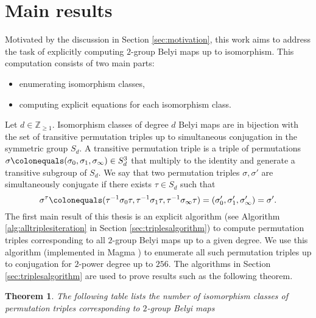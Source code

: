 \documentclass{dcthesis}
\newcommand{\ZZ}{\mathbb Z}
\newcommand{\defi}[1]{\textsf{#1}}
\numberwithin{equation}{section}
\newtheorem{theorem}[equation]{Theorem}
\theoremstyle{definition}
\theoremstyle{remark}
\begin{document}
{{  \section{Main results}{\label{sec:mainresults}
    Motivated by the discussion in
    Section \ref{sec:motivation},
    this work aims to address the task
    of explicitly computing
    $2$-group Belyi maps up to isomorphism.
    This computation consists of two
    main parts:
    \begin{itemize}
      \item
        enumerating isomorphism classes,
      \item
        computing explicit equations
        for each isomorphism class.
    \end{itemize}
    \par
    Let $d\in\ZZ_{\geq 1}$.
    Isomorphism classes of degree $d$
    Belyi maps
    are in bijection with
    the set of
    transitive permutation triples
    up to
    simultaneous conjugation
    in the symmetric group $S_d$.
    A \defi{transitive permutation triple}
    is a triple of permutations
    $\sigma\colonequals
    (\sigma_0,\sigma_1,\sigma_\infty)
    \in S_d^3$
    that multiply to the identity
    and generate a transitive subgroup
    of $S_d$.
    We say
    that two permutation triples
    $\sigma,\sigma'$ are
    \defi{simultaneously conjugate}
    if there exists $\tau\in S_d$ such that
    \begin{equation}\label{eqn:simconj_results}
      \sigma^\tau \colonequals
      (\tau^{-1}\sigma_0\tau, \tau^{-1}\sigma_1\tau, \tau^{-1}\sigma_\infty\tau)
      = \left(\sigma'_0,\sigma'_1,\sigma'_\infty\right)
      = \sigma'.
    \end{equation}
    The first main result of this thesis
    is an explicit algorithm
    (see Algorithm
    \ref{alg:alltriplesiteration}
    in Section \ref{sec:triplesalgorithm})
    to compute permutation triples
    corresponding to all $2$-group Belyi
    maps up to a given degree.
    We use this algorithm (implemented in
    \textsf{Magma} \cite{magma})
    to enumerate
    all such permutation triples
    up to conjugation
    for $2$-power degree
    up to $256$.
    The algorithms in Section
    \ref{sec:triplesalgorithm}
    are used to prove results such as
    the following theorem.
    \begin{theorem}\label{thm:isoclasses_results}
      The following table lists
      the number of isomorphism classes of
      permutation triples corresponding to
      $2$-group Belyi maps

\end{theorem}}}}
\end{document}
